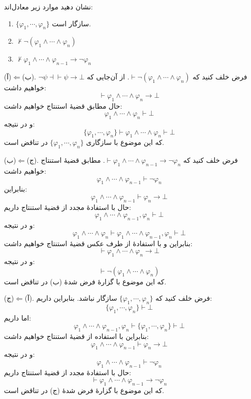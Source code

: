 نشان دهید موارد زیر معادل‌اند:
\begin{enumerate}[label=(\alph*)]
    \item
    $\{\varphi_1,\cdots,\varphi_n\}$
    سازگار است.
    \item $\not\vdash\neg(\varphi_1\wedge\cdots\wedge\varphi_n)$
    \item $\not\vdash\varphi_1\wedge\cdots\wedge\varphi_{n-1}\to\neg\varphi_n$
\end{enumerate}\quad\vspace{-0.5cm}
\begin{ans}
(آ)$\Leftarrow$(ب). فرض خلف کنید که $\vdash\neg(\varphi_1\wedge\cdots\wedge\varphi_n)$. از آن‌جایی که $\neg\psi \dashv\vdash \psi \to \bot$ خواهیم داشت:
$$\vdash \varphi_1\wedge\cdots\wedge\varphi_n \to \bot$$
حال مطابق قضیهٔ استنتاج خواهیم داشت:
$$\varphi_1\wedge\cdots\wedge\varphi_n \vdash \bot$$
و در نتیجه:
$$\{\varphi_1,\cdots,\varphi_n\} \vdash \varphi_1\wedge\cdots\wedge\varphi_n \vdash \bot$$
که این موضوع با سازگاری $\{\varphi_1,\cdots,\varphi_n\}$ در تناقض است.

(ب)$\Leftarrow$(ج). فرض خلف کنید که $\vdash\varphi_1\wedge\cdots\wedge\varphi_{n-1}\to\neg\varphi_n$. مطابق قضیهٔ استنتاج خواهیم داشت:
$$\varphi_1\wedge\cdots\wedge\varphi_{n-1} \vdash \neg\varphi_n$$
بنابراین:
$$\varphi_1\wedge\cdots\wedge\varphi_{n-1} \vdash \varphi_n\to\bot$$
حال با استفادهٔ مجدد از قضیهٔ استنتاج داریم:
$$\varphi_1\wedge\cdots\wedge\varphi_{n-1},\varphi_n \vdash \bot$$
و در نتیجه:
$$\varphi_1\wedge\cdots\wedge\varphi_n \vdash \varphi_1\wedge\cdots\wedge\varphi_{n-1},\varphi_n \vdash \bot$$
بنابراین و با استفادهٔ از طرف عکس قضیهٔ استنتاج خواهیم داشت:
$$\vdash \varphi_1\wedge\cdots\wedge\varphi_n\to\bot$$
و در نتیجه:
$$\vdash \neg(\varphi_1\wedge\cdots\wedge\varphi_n)$$
که این موضوع با گزارهٔ فرض شدهٔ (ب) در تناقض است.

(ج)$\Leftarrow$(آ). فرض خلف کنید که $\{\varphi_1,\cdots,\varphi_n\}$ سازگار نباشد. بنابراین داریم:
$$\{\varphi_1,\cdots,\varphi_n\}\vdash\bot$$
اما داریم:
$$\varphi_1\wedge\cdots\wedge\varphi_{n-1},\varphi_n\vdash\{\varphi_1,\cdots,\varphi_n\}\vdash\bot$$
بنابراین با استفاده از قضیهٔ استنتاج خواهیم داشت:
$$\varphi_1\wedge\cdots\wedge\varphi_{n-1}\vdash\varphi_n\to\bot$$
و در نتیجه:
$$\varphi_1\wedge\cdots\wedge\varphi_{n-1}\vdash\neg\varphi_n$$
حال با استفادهٔ مجدد از قضیهٔ استنتاج داریم:
$$\vdash\varphi_1\wedge\cdots\wedge\varphi_{n-1}\to\neg\varphi_n$$
که این موضوع با گزارهٔ فرض شدهٔ (ج) در تناقض است.
\end{ans}
